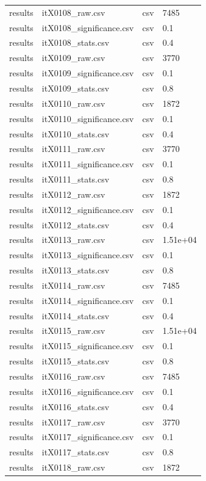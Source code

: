 \begin{landscape}
\begin{longtable}{p{}p{}p{}p{}}
results & itX0108\_raw.csv & csv & 7485 \\
results & itX0108\_significance.csv & csv & 0.1 \\
results & itX0108\_stats.csv & csv & 0.4 \\
results & itX0109\_raw.csv & csv & 3770 \\
results & itX0109\_significance.csv & csv & 0.1 \\
results & itX0109\_stats.csv & csv & 0.8 \\
results & itX0110\_raw.csv & csv & 1872 \\
results & itX0110\_significance.csv & csv & 0.1 \\
results & itX0110\_stats.csv & csv & 0.4 \\
results & itX0111\_raw.csv & csv & 3770 \\
results & itX0111\_significance.csv & csv & 0.1 \\
results & itX0111\_stats.csv & csv & 0.8 \\
results & itX0112\_raw.csv & csv & 1872 \\
results & itX0112\_significance.csv & csv & 0.1 \\
results & itX0112\_stats.csv & csv & 0.4 \\
results & itX0113\_raw.csv & csv & 1.51e+04 \\
results & itX0113\_significance.csv & csv & 0.1 \\
results & itX0113\_stats.csv & csv & 0.8 \\
results & itX0114\_raw.csv & csv & 7485 \\
results & itX0114\_significance.csv & csv & 0.1 \\
results & itX0114\_stats.csv & csv & 0.4 \\
results & itX0115\_raw.csv & csv & 1.51e+04 \\
results & itX0115\_significance.csv & csv & 0.1 \\
results & itX0115\_stats.csv & csv & 0.8 \\
results & itX0116\_raw.csv & csv & 7485 \\
results & itX0116\_significance.csv & csv & 0.1 \\
results & itX0116\_stats.csv & csv & 0.4 \\
results & itX0117\_raw.csv & csv & 3770 \\
results & itX0117\_significance.csv & csv & 0.1 \\
results & itX0117\_stats.csv & csv & 0.8 \\
results & itX0118\_raw.csv & csv & 1872 \\

\end{longtable}
\end{landscape}
